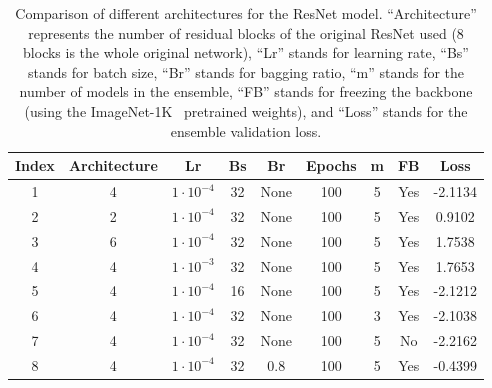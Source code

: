 \begin{table}[ht]
    \centering
    \begin{tabular}{c !{\vrule width 2pt} c|c|c|c|c|c|c !{\vrule width 2pt} c}
        \textbf{Index} & \textbf{Architecture} & \textbf{Lr} & \textbf{Bs} & \textbf{Br} & \textbf{Epochs} & \textbf{m} & \textbf{FB} & \textbf{Loss} \\
         & 4 & $1\cdot10^{-4}$ & 32 & None & 100 & 5 & Yes & -2.1134 \\
        2 & 2 & $1\cdot10^{-4}$ & 32 & None & 100 & 5 & Yes & 0.9102 \\
        3 & 6 & $1\cdot10^{-4}$ & 32 & None & 100 & 5 & Yes & 1.7538 \\
        4 & 4 & $1\cdot10^{-3}$ & 32 & None & 100 & 5 & Yes & 1.7653 \\
        5 & 4 & $1\cdot10^{-4}$ & 16 & None & 100 & 5 & Yes & -2.1212 \\
        6 & 4 & $1\cdot10^{-4}$ & 32 & None & 100 & 3 & Yes & -2.1038 \\
        7 & 4 & $1\cdot10^{-4}$ & 32 & None & 100 & 5 & No & -2.2162 \\
        8 & 4 & $1\cdot10^{-4}$ & 32 & 0.8 & 100 & 5 & Yes & -0.4399 \\
    \end{tabular}
    \caption[Comparison of different architectures for the ResNet model]{
        Comparison of different architectures for the ResNet model.
        ``Architecture'' represents the number of residual blocks of the original ResNet used (8 blocks is the whole original network), ``Lr'' stands for learning rate, ``Bs'' stands for batch size, ``Br'' stands for bagging ratio, ``m'' stands for the number of models in the ensemble, ``FB'' stands for freezing the backbone (using the ImageNet-1K~\cite{src:imagenet} pretrained weights), and ``Loss'' stands for the ensemble validation loss.
    }
    \label{tab:resnet-architectures-comparison}
\end{table}

